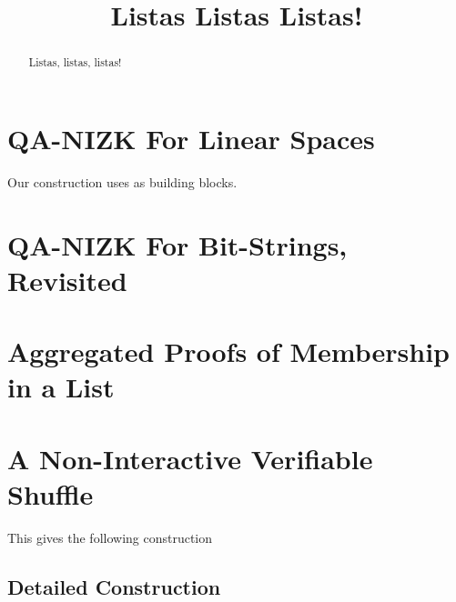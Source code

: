 \documentclass[12pt]{llncs}
\author{\vspace*{-.5cm}}
\institute{\vspace*{-.8cm}}
\title{Listas Listas Listas!}
\begin{document}

\maketitle
\begin{abstract}
Listas, listas, listas!
\end{abstract} 









\section{QA-NIZK For Linear Spaces}

Our construction uses as building blocks.

\section{QA-NIZK For Bit-Strings, Revisited}


%




\section{Aggregated Proofs of Membership in a List}





\section{A Non-Interactive Verifiable Shuffle}

This gives the following construction 




%    
    \subsection{Detailed Construction}
\end{document}
